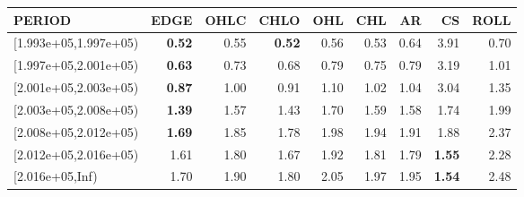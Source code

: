 \begin{table}[ht]
\centering
\begin{tabular}{lrrrrrrrr}
  \hline
PERIOD & EDGE & OHLC & CHLO & OHL & CHL & AR & CS & ROLL \\ 
  \hline
[1.993e+05,1.997e+05) & \textbf{0.52} & 0.55 & \textbf{0.52} & 0.56 & 0.53 & 0.64 & 3.91 & 0.70 \\ 
  [1.997e+05,2.001e+05) & \textbf{0.63} & 0.73 & 0.68 & 0.79 & 0.75 & 0.79 & 3.19 & 1.01 \\ 
  [2.001e+05,2.003e+05) & \textbf{0.87} & 1.00 & 0.91 & 1.10 & 1.02 & 1.04 & 3.04 & 1.35 \\ 
  [2.003e+05,2.008e+05) & \textbf{1.39} & 1.57 & 1.43 & 1.70 & 1.59 & 1.58 & 1.74 & 1.99 \\ 
  [2.008e+05,2.012e+05) & \textbf{1.69} & 1.85 & 1.78 & 1.98 & 1.94 & 1.91 & 1.88 & 2.37 \\ 
  [2.012e+05,2.016e+05) & 1.61 & 1.80 & 1.67 & 1.92 & 1.81 & 1.79 & \textbf{1.55} & 2.28 \\ 
  [2.016e+05,Inf) & 1.70 & 1.90 & 1.80 & 2.05 & 1.97 & 1.95 & \textbf{1.54} & 2.48 \\ 
   \hline
\end{tabular}
\end{table}
